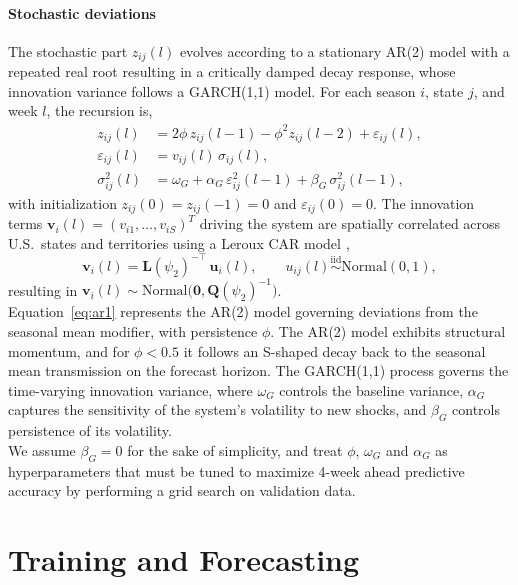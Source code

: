 \documentclass[11pt]{article}
\newcommand{\Normal}{\text{Normal}}
\begin{document}
\paragraph{Stochastic deviations}
The stochastic part $z_{ij}(l)$ evolves according to a stationary AR(2) model with a repeated real root resulting in a critically damped decay response, whose innovation variance follows a GARCH(1,1) model. For each season $i$, state $j$, and week $l$, the recursion is,
\begin{align}
	z_{ij}(l) &= 2 \phi \,z_{ij}(l-1) - \phi^2 z_{ij}(l-2) + \varepsilon_{ij}(l), \\ \label{eq:ar1}
	\varepsilon_{ij}(l) &= v_{ij}(l)\,\sigma_{ij}(l), \\
    \sigma^2_{ij}(l) &= \omega_G + \alpha_G \,\varepsilon^2_{ij}(l-1) + \beta_G\,\sigma^2_{ij}(l-1),
\end{align}
with initialization $z_{ij}(0) = z_{ij}(-1) = 0$ and $\varepsilon_{ij}(0) = 0$. The innovation terms $\bm{v}_i(l) = (v_{i1}, \ldots, v_{iS})^T$ driving the system are spatially correlated across U.S.\ states and territories using a Leroux CAR model \citep{leroux2000},
\begin{equation}
    \bm{v}_i(l) = \bm{L}(\psi_2)^{-\top}\, \bm{u}_i(l), 
    \qquad u_{ij}(l) \overset{\mathrm{iid}}{\sim} \Normal(0, 1),
\end{equation}
resulting in $\bm{v}_i(l) \sim \Normal\big(\bm{0}, \bm{Q}(\psi_2)^{-1}\big)$.\\

Equation~\eqref{eq:ar1} represents the AR(2) model governing deviations from the seasonal mean modifier, with persistence $\phi$. The AR(2) model exhibits structural momentum, and for $\phi < 0.5$ it follows an S-shaped decay back to the seasonal mean transmission on the forecast horizon. The GARCH(1,1) process governs the time-varying innovation variance, where $\omega_G$ controls the baseline variance, $\alpha_G$ captures the sensitivity of the system's volatility to new shocks, and $\beta_G$ controls persistence of its volatility.\\

We assume $\beta_G = 0$ for the sake of simplicity, and treat $\phi$, $\omega_G$ and $\alpha_G$ as hyperparameters that must be tuned to maximize 4-week ahead predictive accuracy by performing a grid search on validation data.


\section{Training and Forecasting}
\end{document}
